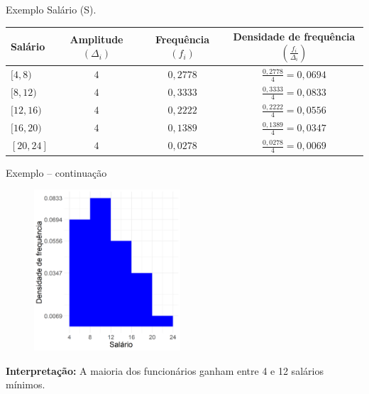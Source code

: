 \documentclass[9pt]{beamer}
\begin{document}
\begin{frame}{Exemplo}
 Salário (S).
 \begin{table}
  \centering
  \begin{tabular}{l|ccc}
   \toprule[0.05cm]
   Salário & Amplitude $(\Delta_i)$ & Frequência $(f_i)$ & Densidade de frequência $\left(\frac{f_i}{\Delta_i}\right)$\\
   \midrule[0.05cm]
    $[4,8)$ & $4$ & $0,2778$ & $\frac{0,2778}{4}=0,0694$\\
    $[8,12)$ & $4$ & $0,3333$ & $\frac{0,3333}{4}=0,0833$\\
    $[12,16)$ & $4$ & $0,2222$ & $\frac{0,2222}{4}=0,0556$\\
    $[16,20)$ & $4$ & $0,1389$ & $\frac{0,1389}{4}=0,0347$\\
    $[20,24]$ & $4$ & $0,0278$ & $\frac{0,0278}{4}=0,0069$\\
    \bottomrule[0.05cm]
  \end{tabular}
 \end{table}

\end{frame}

\begin{frame}{Exemplo -- continuação}
 \begin{figure}
  \centering
  \includegraphics[height=6cm]{histograma.png}
 \end{figure}
\textbf{Interpretação:} A maioria dos funcionários ganham entre 4 e 12 salários mínimos.
\end{frame}
\end{document}
